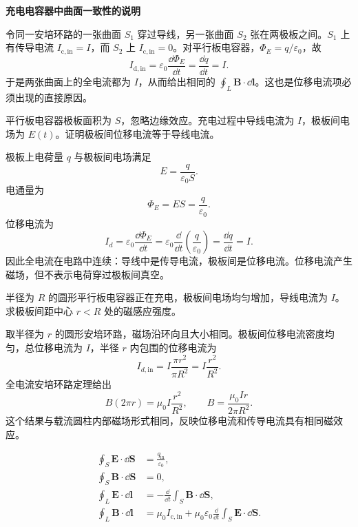 \textbf{充电电容器中曲面一致性的说明}

令同一安培环路的一张曲面 $S_1$ 穿过导线，另一张曲面 $S_2$ 张在两极板之间。$S_1$ 上有传导电流 $I_{\mathrm{c,in}}=I$，而 $S_2$ 上 $I_{\mathrm{c,in}}=0$。对平行板电容器，$\Phi_E=q/\varepsilon_0$，故
\[
  I_{\mathrm{d,in}}=\varepsilon_0\frac{\dd\Phi_E}{\dd t}
  =\frac{\dd q}{\dd t}=I.
\]
于是两张曲面上的全电流都为 $I$，从而给出相同的 $\oint_L\bm B\cdot\dd\bm l$。这也是位移电流项必须出现的直接原因。

\begin{example}[title={充电平行板电容器中的位移电流}]\label{eg:charging-capacitor}
平行板电容器极板面积为 $S$，忽略边缘效应。充电过程中导线电流为 $I$，极板间电场为 $E(t)$。证明极板间位移电流等于导线电流。
\begin{solution}
极板上电荷量 $q$ 与极板间电场满足
\[
  E=\frac{q}{\varepsilon_0 S}.
\]
电通量为
\[
  \Phi_E=ES=\frac{q}{\varepsilon_0}.
\]
位移电流为
\[
  I_d=\varepsilon_0\frac{\dd\Phi_E}{\dd t}
  =\varepsilon_0\frac{\dd}{\dd t}\left(\frac{q}{\varepsilon_0}\right)
  =\frac{\dd q}{\dd t}=I.
\]
因此全电流在电路中连续：导线中是传导电流，极板间是位移电流。位移电流产生磁场，但不表示电荷穿过极板间真空。
\end{solution}
\end{example}

\begin{example}[title={由位移电流求极板间磁场}]\label{eg:displacement-current-B}
半径为 $R$ 的圆形平行板电容器正在充电，极板间电场均匀增加，导线电流为 $I$。求极板间距中心 $r<R$ 处的磁感应强度。
\begin{solution}
取半径为 $r$ 的圆形安培环路，磁场沿环向且大小相同。极板间位移电流密度均匀，总位移电流为 $I$，半径 $r$ 内包围的位移电流为
\[
  I_{d,\mathrm{in}}=I\frac{\pi r^2}{\pi R^2}=I\frac{r^2}{R^2}.
\]
全电流安培环路定理给出
\[
  B(2\pi r)=\mu_0 I\frac{r^2}{R^2},
  \qquad
  B=\frac{\mu_0 I r}{2\pi R^2}.
\]
这个结果与载流圆柱内部磁场形式相同，反映位移电流和传导电流具有相同磁效应。
\end{solution}
\end{example}

\begin{theorem}[真空中麦克斯韦方程组的积分形式]\label{thm:maxwell-integral}
\[
\begin{aligned}
  \oint_S \bm E\cdot\dd\bm S &= \frac{q_{\mathrm{in}}}{\varepsilon_0},\\
  \oint_S \bm B\cdot\dd\bm S &=0,\\
  \oint_L \bm E\cdot\dd\bm l &=-\frac{\dd}{\dd t}\int_S \bm B\cdot\dd\bm S,\\
  \oint_L \bm B\cdot\dd\bm l &=\mu_0 I_{\mathrm{c,in}}+\mu_0\varepsilon_0\frac{\dd}{\dd t}\int_S\bm E\cdot\dd\bm S.
\end{aligned}
\]
\end{theorem}

